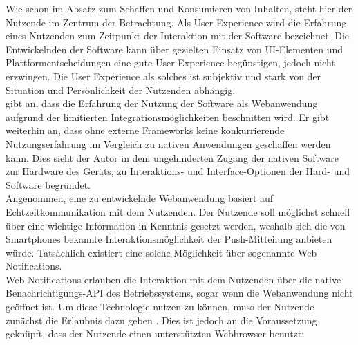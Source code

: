 \documentclass[a4paper]{scrartcl}
\begin{document}
Wie schon im Absatz zum Schaffen und Konsumieren von Inhalten, steht hier der Nutzende im Zentrum der Betrachtung. Als User Experience wird die Erfahrung eines Nutzenden zum Zeitpunkt der Interaktion mit der Software bezeichnet. Die Entwickelnden der Software kann über gezielten Einsatz von UI-Elementen und Plattformentscheidungen eine gute User Experience begünstigen, jedoch nicht erzwingen. Die User Experience als solches ist subjektiv und stark von der Situation und Persönlichkeit der Nutzenden abhängig. \\
\textcite[28]{Jobe} gibt an, dass die Erfahrung der Nutzung der Software als Webanwendung aufgrund der limitierten Integrationsmöglichkeiten beschnitten wird. Er gibt weiterhin an, dass ohne externe Frameworks keine konkurrierende Nutzungserfahrung im Vergleich zu nativen Anwendungen geschaffen werden kann. Dies sieht der Autor in dem ungehinderten Zugang der nativen Software zur Hardware des Geräts, zu Interaktions- und Interface-Optionen der Hard- und Software begründet. \\

Angenommen, eine zu entwickelnde Webanwendung basiert auf Echtzeitkommunikation mit dem Nutzenden. Der Nutzende soll möglichst schnell über eine wichtige Information in Kenntnis gesetzt werden, weshalb sich die von Smartphones bekannte Interaktionsmöglichkeit der Push-Mitteilung anbieten würde. Tatsächlich existiert eine solche Möglichkeit über sogenannte Web Notifications. \\
Web Notifications erlauben die Interaktion mit dem Nutzenden über die native Benachrichtigungs-API des Betriebssystems, sogar wenn die Webanwendung nicht geöffnet ist. Um diese Technologie nutzen zu können, muss der Nutzende zunächst die Erlaubnis dazu geben \autocite{Notifications_API}. Dies ist jedoch an die Voraussetzung geknüpft, dass der Nutzende einen unterstützten Webbrowser benutzt:
\end{document}
